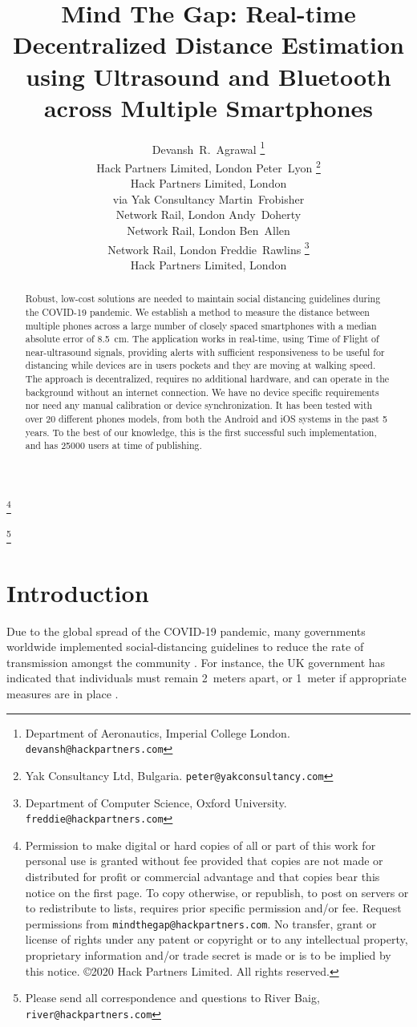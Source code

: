 \documentclass{article}
\title{Mind The Gap: Real-time Decentralized Distance Estimation using Ultrasound and Bluetooth across Multiple Smartphones}
\author{
Devansh~R.~Agrawal \thanks{Department of Aeronautics, Imperial College London. \texttt{devansh@hackpartners.com}}\\
Hack Partners Limited, London
\And
Peter~Lyon \thanks{Yak Consultancy Ltd, Bulgaria. \texttt{peter@yakconsultancy.com}}\\
Hack Partners Limited, London\\
via Yak Consultancy
\And
Martin~Frobisher\\
Network Rail, London
\And
Andy~Doherty\\
Network Rail, London
\And
Ben~Allen\\
Network Rail, London
\And
Freddie~Rawlins \thanks{Department of Computer Science, Oxford University. \texttt{freddie@hackpartners.com}}\\
Hack Partners Limited, London
}
\newcommand\blfootnote[1]{%
  \begingroup
  \renewcommand\thefootnote{}\footnote{#1}%
  \addtocounter{footnote}{-1}%
  \endgroup
}
\begin{document}
\blfootnote{Permission to make digital or hard copies of all or part of this work for personal use is granted without fee provided that copies are not made or distributed for profit or commercial advantage and that copies bear this notice on the first page. To copy otherwise, or republish, to post on servers or to redistribute to lists, requires prior specific permission and/or fee. Request permissions from \texttt{mindthegap@hackpartners.com}. No transfer, grant or license of rights under any patent or copyright or to any intellectual property, proprietary information and/or trade secret is made or is to be implied by this notice.
\copyright 2020 Hack Partners Limited. All rights reserved.}
\blfootnote{Please send all correspondence and questions to River Baig, \texttt{river@hackpartners.com}}
\maketitle


\begin{abstract}

Robust, low-cost solutions are needed to maintain social distancing guidelines during the COVID-19 pandemic. We establish a method to measure the distance between multiple phones across a large number of closely spaced smartphones with a median absolute error of 8.5~cm. The application works in real-time, using Time of Flight of near-ultrasound signals, providing alerts with sufficient responsiveness to be useful for distancing while devices are in users pockets and they are moving at walking speed. The approach is decentralized, requires no additional hardware, and can operate in the background without an internet connection. We have no device specific requirements nor need any manual calibration or device synchronization. It has been tested with over 20 different phones models, from both the Android and iOS systems in the past 5 years.
To the best of our knowledge, this is the first successful such implementation, and has 25000 users at time of publishing.
\end{abstract}



\section{Introduction}

Due to the global spread of the COVID-19 pandemic, many governments worldwide implemented social-distancing guidelines to reduce the rate of transmission amongst the community \cite{WHO2020}. For instance, the UK government has indicated that individuals must remain 2~meters apart, or 1~meter if appropriate measures are in place \cite{UKGuidance}. 
\end{document}

